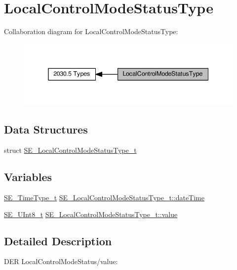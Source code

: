\hypertarget{group__LocalControlModeStatusType}{}\section{Local\+Control\+Mode\+Status\+Type}
\label{group__LocalControlModeStatusType}
Collaboration diagram for Local\+Control\+Mode\+Status\+Type\+:\nopagebreak
\begin{figure}[H]
\begin{center}
\leavevmode
\includegraphics[width=338pt]{group__LocalControlModeStatusType}
\end{center}
\end{figure}
\subsection*{Data Structures}
\begin{DoxyCompactItemize}
\item 
struct \hyperlink{structSE__LocalControlModeStatusType__t}{S\+E\+\_\+\+Local\+Control\+Mode\+Status\+Type\+\_\+t}
\end{DoxyCompactItemize}
\subsection*{Variables}
\begin{DoxyCompactItemize}
\item 
\hyperlink{group__TimeType_ga6fba87a5b57829b4ff3f0e7638156682}{S\+E\+\_\+\+Time\+Type\+\_\+t} \hyperlink{group__LocalControlModeStatusType_gaa79487aaca6ea9a486b2513a4f668cae}{S\+E\+\_\+\+Local\+Control\+Mode\+Status\+Type\+\_\+t\+::date\+Time}
\item 
\hyperlink{group__UInt8_gaf7c365a1acfe204e3a67c16ed44572f5}{S\+E\+\_\+\+U\+Int8\+\_\+t} \hyperlink{group__LocalControlModeStatusType_ga6402cc57eae81561c6f80db12cb16705}{S\+E\+\_\+\+Local\+Control\+Mode\+Status\+Type\+\_\+t\+::value}
\end{DoxyCompactItemize}


\subsection{Detailed Description}
D\+ER Local\+Control\+Mode\+Status/value\+:

